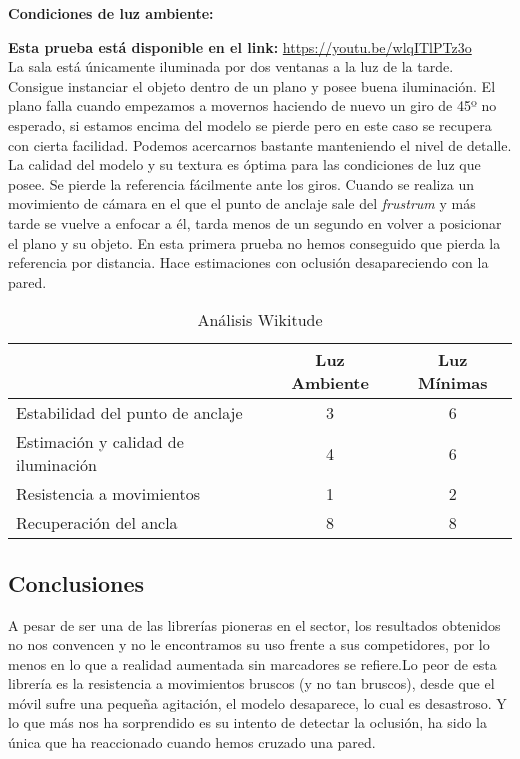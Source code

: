\textbf{Condiciones de luz ambiente:}

\textbf{Esta prueba está disponible en el link:} \url{https://youtu.be/wlqITlPTz3o}\\

La sala está únicamente iluminada por dos ventanas a la luz de la tarde.\\

Consigue instanciar el objeto dentro de un plano y posee buena iluminación. El plano falla cuando empezamos a movernos haciendo de nuevo un giro de 45º no esperado, si estamos encima del modelo se pierde pero en este caso se recupera con cierta facilidad. Podemos acercarnos bastante manteniendo el nivel de detalle. La calidad del modelo y su textura es óptima para las condiciones de luz que posee. Se pierde la referencia fácilmente ante los giros. Cuando se realiza un movimiento de cámara en el que el punto de anclaje sale del \textit{frustrum} y más tarde se vuelve a enfocar a él, tarda menos de un segundo en volver a posicionar el plano y su objeto. En esta primera prueba no hemos conseguido que pierda la referencia por distancia. Hace estimaciones con oclusión desapareciendo con la pared.

\begin{table}[H]
    \centering
    \begin{tabular}{|l|c|c|}
    \hline
          & Luz Ambiente & Luz Mínimas \\
         \hline
        Estabilidad del punto de anclaje   &3 &6\\
        \hline
        Estimación y calidad de iluminación  &4 &6 \\
        \hline
        Resistencia a movimientos  &1 &2 \\
        \hline
        Recuperación del ancla  &8 &8 \\
      \hline
    \end{tabular}
    \caption{Análisis Wikitude}
    \label{tab:TWikitude}
\end{table}

\subsection{Conclusiones}
A pesar de ser una de las librerías pioneras en el sector, los resultados obtenidos no nos convencen y no le encontramos su uso frente a sus competidores, por lo menos en lo que a realidad aumentada sin marcadores se refiere.Lo peor de esta librería es la resistencia a movimientos bruscos (y no tan bruscos), desde que el móvil sufre una pequeña agitación, el modelo desaparece, lo cual es desastroso. Y lo que más nos ha sorprendido es su intento de detectar la oclusión, ha sido la única que ha reaccionado cuando hemos cruzado una pared.
\clearpage
